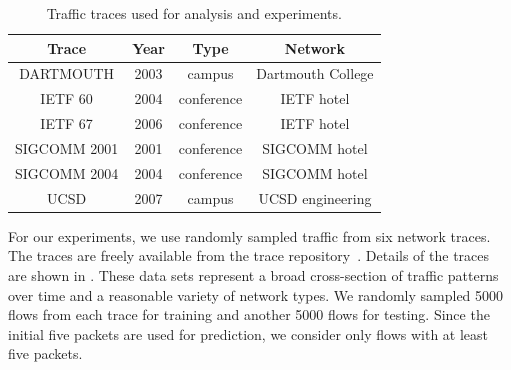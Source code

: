 \documentclass{acm_proc_article-sp}
\begin{document}

\begin{table}
\vspace{0.5em}
\begin{center}
\small
\begin{tabular}{|c|c|c|c|}

\hline
\textbf{Trace} &
\textbf{Year} &
\textbf{Type} &
\textbf{Network} \\
\hline

{\scriptsize{DARTMOUTH}} &
2003 &
campus &
Dartmouth College \\
\hline

{\scriptsize{IETF 60}} &
2004 &
conference &
IETF hotel \\
\hline

{\scriptsize{IETF 67}} &
2006 &
conference &
IETF hotel \\
\hline

{\scriptsize{SIGCOMM 2001}} &
2001 &
conference &
SIGCOMM hotel \\
\hline

{\scriptsize{SIGCOMM 2004}} &
2004 &
conference &
SIGCOMM hotel \\
\hline

{\scriptsize{UCSD}} &
2007 &
campus &
UCSD engineering \\
\hline

\end{tabular}
\caption{Traffic traces used for analysis and experiments.}
\end{center}
\vspace{-2.5em}
\end{table}

For our experiments, we use randomly sampled traffic from six network traces.
The traces are freely available from the  trace repository~\cite{Yeo06}.
Details of the traces are shown in .
These data sets represent a broad cross-section of traffic patterns over time and a reasonable variety of network types.
We randomly sampled 5000 flows from each trace for training and another 5000 flows for testing.
Since the initial five packets are used for prediction, we consider only flows with at least five packets.
\end{document}
